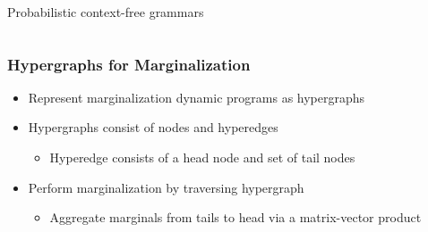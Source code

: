 \documentclass{beamer}
\begin{document}
\begin{frame}
\begin{itemize}
\begin{columns}
\begin{column}{0.5\textwidth}
\begin{center}

\vspace{.11em}
\small{Probabilistic context-free grammars}
\end{center}
\end{column}

\end{columns}
\end{itemize}

\end{frame}

\begin{frame}
\frametitle{Hypergraphs for Marginalization}
\begin{itemize}
\item Represent marginalization dynamic programs as hypergraphs
\vspace{1em}
\item Hypergraphs consist of nodes and hyperedges
    \begin{itemize}
    \item Hyperedge consists of a head node and set of tail nodes
    \end{itemize}
\vspace{1em}
\item Perform marginalization by traversing hypergraph
    \begin{itemize}
    \item Aggregate marginals from tails to head via a matrix-vector product
    \end{itemize}
\end{itemize}
\begin{columns}

\begin{column}{0.5\textwidth}
\begin{center}
\end{center}
\end{column}

\begin{column}{0.5\textwidth}
\begin{center}
\begin{tikzpicture}


\end{tikzpicture}
\end{center}
\end{column}
\end{columns}
\end{frame}
\end{document}
